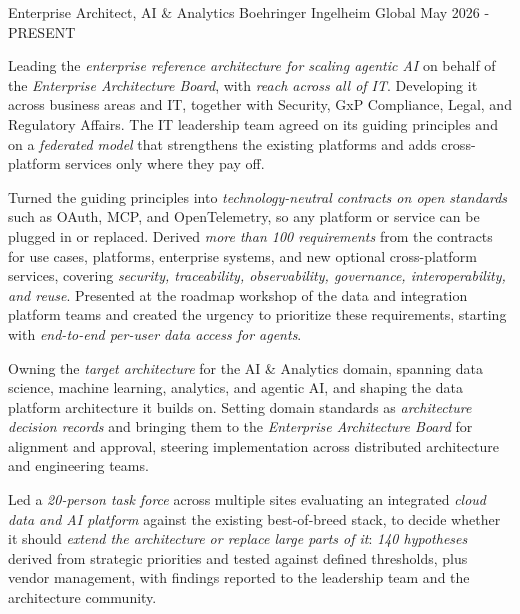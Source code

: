 \begin{cventries}

  \cventry
    {Enterprise Architect, AI \& Analytics} %
    {Boehringer Ingelheim} %
    {Global} %
    {May 2026 - PRESENT} %
    {
      \begin{cvitems}
        \item {Leading the \textit{enterprise reference architecture for scaling agentic AI} on behalf of the \textit{Enterprise Architecture Board}, with \textit{reach across all of IT}. Developing it across business areas and IT, together with Security, GxP Compliance, Legal, and Regulatory Affairs. The IT leadership team agreed on its guiding principles and on a \textit{federated model} that strengthens the existing platforms and adds cross-platform services only where they pay off.}
        \item {Turned the guiding principles into \textit{technology-neutral contracts on open standards} such as OAuth, MCP, and OpenTelemetry, so any platform or service can be plugged in or replaced. Derived \textit{more than 100 requirements} from the contracts for use cases, platforms, enterprise systems, and new optional cross-platform services, covering \textit{security, traceability, observability, governance, interoperability, and reuse}. Presented at the roadmap workshop of the data and integration platform teams and created the urgency to prioritize these requirements, starting with \textit{end-to-end per-user data access for agents}.}
        \item {Owning the \textit{target architecture} for the AI \& Analytics domain, spanning data science, machine learning, analytics, and agentic AI, and shaping the data platform architecture it builds on. Setting domain standards as \textit{architecture decision records} and bringing them to the \textit{Enterprise Architecture Board} for alignment and approval, steering implementation across distributed architecture and engineering teams.}
        \item {Led a \textit{20-person task force} across multiple sites evaluating an integrated \textit{cloud data and AI platform} against the existing best-of-breed stack, to decide whether it should \textit{extend the architecture or replace large parts of it}: \textit{140 hypotheses} derived from strategic priorities and tested against defined thresholds, plus vendor management, with findings reported to the leadership team and the architecture community.}

\end{cvitems}}
\end{cventries}

